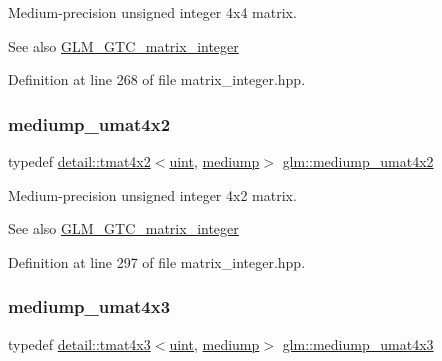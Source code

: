 Medium-\/precision unsigned integer 4x4 matrix. \begin{DoxySeeAlso}{See also}
\hyperlink{group__gtc__matrix__integer}{G\+L\+M\+\_\+\+G\+T\+C\+\_\+matrix\+\_\+integer} 
\end{DoxySeeAlso}


Definition at line 268 of file matrix\+\_\+integer.\+hpp.

\mbox{\label{group__gtc__matrix__integer_ga8ea45737e8bc9bfae2668968056b109f}} 
\subsubsection{\texorpdfstring{mediump\+\_\+umat4x2}{mediump\_umat4x2}}
{\footnotesize\ttfamily typedef \hyperlink{structglm_1_1detail_1_1tmat4x2}{detail\+::tmat4x2}$<$\hyperlink{group__core__precision_ga4fd29415871152bfb5abd588334147c8}{uint}, \hyperlink{namespaceglm_a0f04f086094c747d227af4425893f545a6416f3ea0c9025fb21ed50c4d6620482}{mediump}$>$ \hyperlink{group__gtc__matrix__integer_ga8ea45737e8bc9bfae2668968056b109f}{glm\+::mediump\+\_\+umat4x2}}

Medium-\/precision unsigned integer 4x2 matrix. \begin{DoxySeeAlso}{See also}
\hyperlink{group__gtc__matrix__integer}{G\+L\+M\+\_\+\+G\+T\+C\+\_\+matrix\+\_\+integer} 
\end{DoxySeeAlso}


Definition at line 297 of file matrix\+\_\+integer.\+hpp.

\mbox{\label{group__gtc__matrix__integer_gaebe3b1b4b6030c096447e40fb00528f4}} 
\subsubsection{\texorpdfstring{mediump\+\_\+umat4x3}{mediump\_umat4x3}}
{\footnotesize\ttfamily typedef \hyperlink{structglm_1_1detail_1_1tmat4x3}{detail\+::tmat4x3}$<$\hyperlink{group__core__precision_ga4fd29415871152bfb5abd588334147c8}{uint}, \hyperlink{namespaceglm_a0f04f086094c747d227af4425893f545a6416f3ea0c9025fb21ed50c4d6620482}{mediump}$>$ \hyperlink{group__gtc__matrix__integer_gaebe3b1b4b6030c096447e40fb00528f4}{glm\+::mediump\+\_\+umat4x3}}

